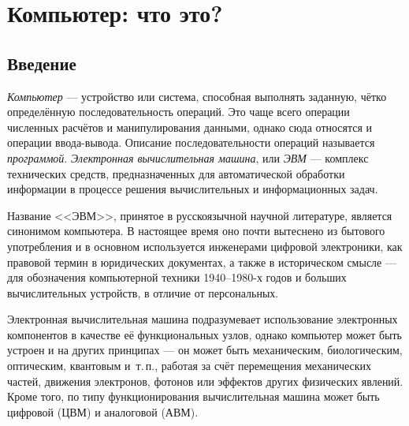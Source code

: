 \section{Компьютер: что это?}\label{base:introduction:computer}
\subsection{Введение}\label{base:introduction:computer:introduction}
\emph{Компьютер} --- устройство или система, способная выполнять заданную, чётко определённую последовательность операций. Это чаще всего операции численных расчётов и манипулирования данными, однако сюда относятся и операции ввода-вывода. Описание последовательности операций называется \emph{программой}.
\emph{Электронная вычислительная машина}, или \emph{ЭВМ} --- комплекс технических средств, предназначенных для автоматической обработки информации в процессе решения вычислительных и информационных задач.

Название <<ЭВМ>>, принятое в русскоязычной научной литературе, является синонимом компьютера. В настоящее время оно почти вытеснено из бытового употребления и в основном используется инженерами цифровой электроники, как правовой термин в юридических документах, а также в историческом смысле --- для обозначения компьютерной техники 1940--1980-х годов и больших вычислительных устройств, в отличие от персональных.

Электронная вычислительная машина подразумевает использование электронных компонентов в качестве её функциональных узлов, однако компьютер может быть устроен и на других принципах --- он может быть механическим, биологическим, оптическим, квантовым и~т.\,п., работая за счёт перемещения механических частей, движения электронов, фотонов или эффектов других физических явлений. Кроме того, по типу функционирования вычислительная машина может быть цифровой (ЦВМ) и аналоговой (АВМ).


